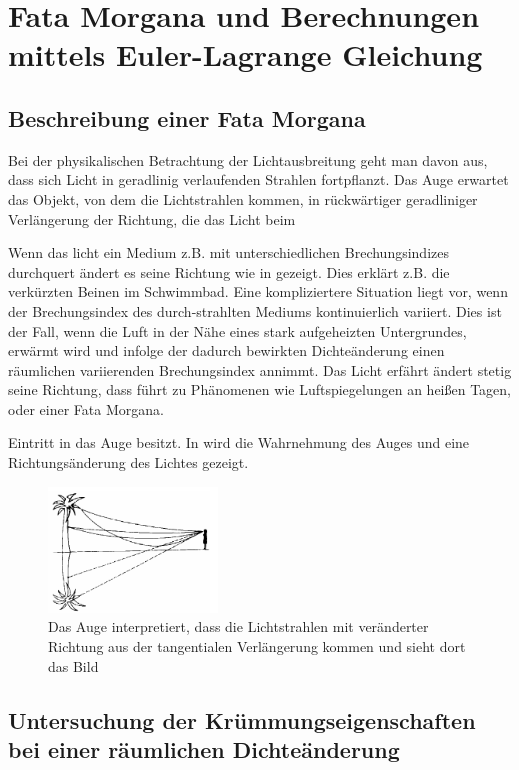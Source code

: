 \section{Fata Morgana und Berechnungen mittels Euler-Lagrange Gleichung}
\subsection{Beschreibung einer Fata Morgana}
\cite{fataEinleitung}
Bei der physikalischen Betrachtung der Lichtausbreitung geht man davon aus, dass sich Licht in
geradlinig verlaufenden Strahlen fortpflanzt. Das Auge erwartet das Objekt, von dem die Lichtstrahlen
kommen, in rückwärtiger geradliniger Verlängerung der Richtung, die das Licht beim

Wenn das licht ein Medium z.B. mit unterschiedlichen Brechungsindizes durchquert ändert es seine Richtung wie in  gezeigt. Dies erklärt z.B. die verkürzten Beinen im Schwimmbad.
Eine kompliziertere Situation liegt vor, wenn der Brechungsindex des durch-strahlten Mediums kontinuierlich variiert. 
Dies ist der Fall, wenn die Luft in der Nähe eines stark aufgeheizten Untergrundes, erwärmt
wird und infolge der dadurch bewirkten Dichteänderung einen räumlichen variierenden Brechungsindex annimmt. 
Das Licht erfährt ändert stetig seine Richtung, dass führt zu Phänomenen wie Luftspiegelungen an heißen Tagen, oder einer Fata Morgana. 

Eintritt in das Auge besitzt. In  wird die Wahrnehmung des Auges und eine Richtungsänderung des Lichtes gezeigt.

\begin{figure}[H]
	\includegraphics[width=0.4\textwidth]{./picture/FataEinleitung.png}
	\caption{Das Auge interpretiert, dass die Lichtstrahlen mit veränderter Richtung aus der tangentialen Verlängerung kommen und sieht dort das Bild}
	\label{Ab:fataEinleitung}
\end{figure}


\subsection{Untersuchung der Krümmungseigenschaften bei einer räumlichen Dichteänderung}


